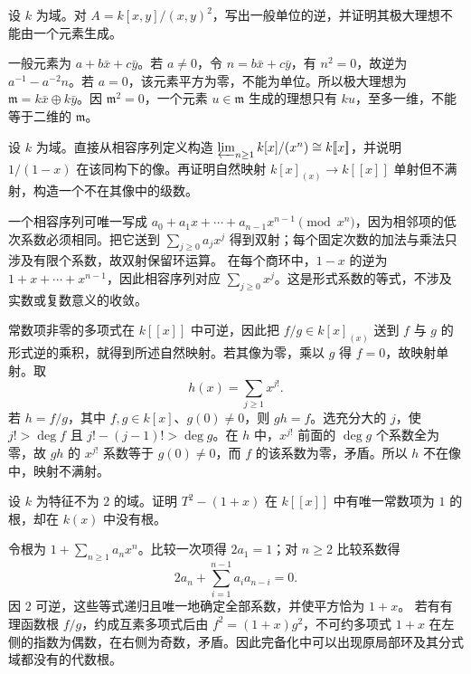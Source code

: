 \begin{exercise}\label{b3:ex:02-square-zero-local}
	设 \(k\) 为域。对 \(A=k[x,y]/(x,y)^2\)，写出一般单位的逆，并证明其极大理想不能由一个元素生成。
\end{exercise}
\begin{solution}
	一般元素为 \(a+b\bar x+c\bar y\)。若 \(a\ne0\)，令 \(n=b\bar x+c\bar y\)，有 \(n^2=0\)，故逆为 \(a^{-1}-a^{-2}n\)。若 \(a=0\)，该元素平方为零，不能为单位。所以极大理想为 \(\mathfrak m=k\bar x\oplus k\bar y\)。因 \(\mathfrak m^2=0\)，一个元素 \(u\in\mathfrak m\) 生成的理想只有 \(ku\)，至多一维，不能等于二维的 \(\mathfrak m\)。
\end{solution}

\begin{exercise}\label{b3:ex:02-completion-compatible}
	设 \(k\) 为域。直接从相容序列定义构造 \(\varprojlim_{n\ge1} k[x]/(x^n)\cong k[\![x]\!]\)，并说明 \(1/(1-x)\) 在该同构下的像。再证明自然映射 \(k[x]_{(x)}\rightarrow k[\![x]\!]\) 单射但不满射，构造一个不在其像中的级数。
\end{exercise}
\begin{solution}
	一个相容序列可唯一写成 \(a_0+a_1x+\cdots+a_{n-1}x^{n-1}\pmod{x^n}\)，因为相邻项的低次系数必须相同。把它送到 \(\sum_{j\ge0}a_jx^j\) 得到双射；每个固定次数的加法与乘法只涉及有限个系数，故双射保留环运算。 在每个商环中，\(1-x\) 的逆为 \(1+x+\cdots+x^{n-1}\)，因此相容序列对应 \(\sum_{j\ge0}x^j\)。这是形式系数的等式，不涉及实数或复数意义的收敛。

	常数项非零的多项式在 \(k[\![x]\!]\) 中可逆，因此把 \(f/g\in k[x]_{(x)}\) 送到 \(f\) 与 \(g\) 的形式逆的乘积，就得到所述自然映射。若其像为零，乘以 \(g\) 得 \(f=0\)，故映射单射。取
	\[
		h(x)=\sum_{j\ge1}x^{j!}.
	\]
	若 \(h=f/g\)，其中 \(f,g\in k[x]\)、\(g(0)\ne0\)，则 \(gh=f\)。选充分大的 \(j\)，使 \(j!>\deg f\) 且 \(j!-(j-1)!>\deg g\)。在 \(h\) 中，\(x^{j!}\) 前面的 \(\deg g\) 个系数全为零，故 \(gh\) 的 \(x^{j!}\) 系数等于 \(g(0)\ne0\)，而 \(f\) 的该系数为零，矛盾。所以 \(h\) 不在像中，映射不满射。
\end{solution}

\begin{exercise}\label{b3:ex:02-root-lifting-warning}
	设 \(k\) 为特征不为 \(2\) 的域。证明 \(T^2-(1+x)\) 在 \(k[\![x]\!]\) 中有唯一常数项为 \(1\) 的根，却在 \(k(x)\) 中没有根。
\end{exercise}
\begin{solution}
	令根为 \(1+\sum_{n\ge1}a_nx^n\)。比较一次项得 \(2a_1=1\)；对 \(n\ge2\) 比较系数得
	\[
		2a_n+\sum_{i=1}^{n-1}a_i a_{n-i}=0.
	\]
	因 \(2\) 可逆，这些等式递归且唯一地确定全部系数，并使平方恰为 \(1+x\)。 若有有理函数根 \(f/g\)，约成互素多项式后由 \(f^2=(1+x)g^2\)，不可约多项式 \(1+x\) 在左侧的指数为偶数，在右侧为奇数，矛盾。因此完备化中可以出现原局部环及其分式域都没有的代数根。
\end{solution}

